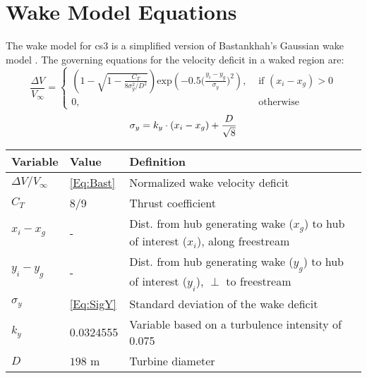 \documentclass[10pt]{article}
\begin{document}
\section*{Wake Model Equations}
    The wake model for cs3 is a simplified version of Bastankhah's Gaussian wake model \cite{Thomas2018}.
    The governing equations for the velocity deficit in a waked region are:\\
    \begin{equation}
        \frac{\Delta V}{V_{\infty}}
        =
        \begin{cases}
        \left(
            1 - \sqrt{
                1 - \frac{C_T}
                    {8\sigma_{y}^{2}/D^2}
                }
        \right)
                \text{exp}\left(
                    -0.5\Big(
                        \frac{y_{i}-y_{g}}{\sigma_{y}}
                    \Big)^2
                \right),
        & \text{ if } (x_i - x_g) > 0\\
        0, & \text{ otherwise }
        \end{cases}
        \label{Eq:Bast}
    \end{equation}
    \begin{equation}
        \sigma_y = k_y\cdot (x_{i}-x_{g}) + \frac{D}{\sqrt{8}} \\
        \label{Eq:SigY}
    \end{equation}
    \begin{center}
    \begin{tabular}{@{}lll@{}}
        \toprule
            Variable & Value & Definition \\ 
            \midrule
        $\Delta V / V_{\infty}$ & \cref{Eq:Bast} & Normalized wake velocity deficit \\ 
        $C_T$ & 8/9 & Thrust coefficient \\ 
        $x_{i}-x_{g}$ & - & Dist. from hub generating wake ($x_g$) to hub of interest ($x_i$), along freestream \\ 
        $y_{i}-y_{g}$ & - & Dist. from hub generating wake ($y_g$) to hub of interest ($y_i$), $\perp$ to freestream  \\ 
        $\sigma_y$ & \cref{Eq:SigY} & Standard deviation of the wake deficit \\ 
        $k_y$ & 0.0324555 & Variable based on a turbulence intensity of 0.075 \cite{Thomas2018, Niayifar2016} \\ 
        $D$ & $198$ m & Turbine diameter \cite{NREL10MW}\\
        \bottomrule
    \end{tabular}
    \end{center}
\end{document}
